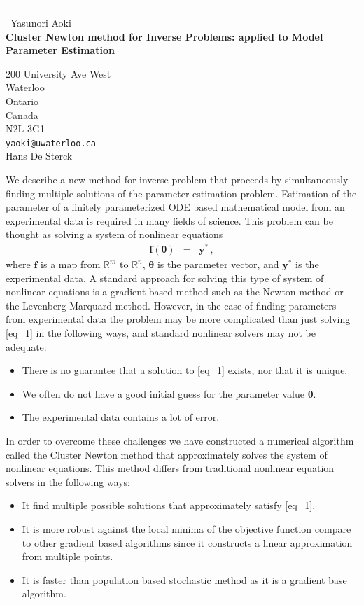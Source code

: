 \documentclass{report}
\begin{document}
\begin{center}
\rule{6in}{1pt} \
{\large Yasunori Aoki \\
{\bf Cluster Newton method for Inverse Problems: applied to Model Parameter Estimation}}

200 University Ave West \\ Waterloo \\ Ontario \\ Canada \\ N2L 3G1
\\
{\tt yaoki@uwaterloo.ca}\\
Hans De Sterck\end{center}

We describe a new method for inverse problem that proceeds by
simultaneously finding multiple solutions of the parameter estimation
problem. Estimation of the parameter of a finitely parameterized ODE
based mathematical model from an experimental data is required in many
fields of science. This problem can be thought as solving a system of
nonlinear equations
\begin{eqnarray}
\boldsymbol{f}(\boldsymbol{\theta})&=&\boldsymbol{y}^*\,, \label{eq_1}
\end{eqnarray}
where $\boldsymbol{f}$ is a map from $\mathbb{R}^m$ to $\mathbb{R}^n$,
$\boldsymbol{\theta}$ is the parameter vector, and $\boldsymbol{y}^*$ is
the experimental data. A standard approach for solving this type of
system of nonlinear equations is a gradient based method such as the
Newton method or the Levenberg-Marquard method. However, in the case of
finding parameters from experimental data the problem may be more
complicated than just solving \eqref{eq_1} in the following ways, and
standard nonlinear solvers may not be adequate:
\begin{itemize}
\item There is no guarantee that a solution to \eqref{eq_1} exists, nor
that it is unique.
\item We often do not have a good initial guess for the parameter value
$\boldsymbol{\theta}$.
\item The experimental data contains a lot of error.
\end{itemize}
In order to overcome these challenges we have constructed a numerical
algorithm called the Cluster Newton method that approximately solves the
system of nonlinear equations. This method differs from traditional
nonlinear equation solvers in the following ways:
\begin{itemize}
\item It find multiple possible solutions that approximately satisfy \eqref{eq_1}.
\item It is more robust against the local minima of the objective
function compare to other gradient based algorithms since it constructs a
linear approximation from multiple points.
\item It is faster than population based stochastic method as it is a
gradient base algorithm.
\end{itemize}
\end{document}
